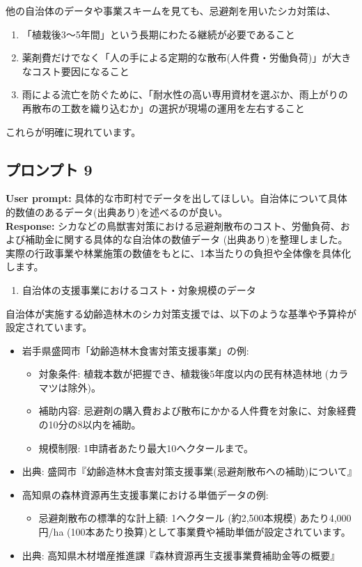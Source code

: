 \documentclass[a4paper, 11pt]{jsarticle}
\begin{document}
他の自治体のデータや事業スキームを見ても、忌避剤を用いたシカ対策は、
\begin{enumerate}
    \item 「植栽後3〜5年間」という長期にわたる継続が必要であること
    \item 薬剤費だけでなく「人の手による定期的な散布(人件費・労働負荷)」が大きなコスト要因になること
    \item 雨による流亡を防ぐために、「耐水性の高い専用資材を選ぶか、雨上がりの再散布の工数を織り込むか」の選択が現場の運用を左右すること
\end{enumerate}
これらが明確に現れています。

\subsection{プロンプト 9}
\noindent\textbf{User prompt:} 具体的な市町村でデータを出してほしい。自治体について具体的数値のあるデータ(出典あり)を述べるのが良い。 \\
\noindent\textbf{Response:} シカなどの鳥獣害対策における忌避剤散布のコスト、労働負荷、および補助金に関する具体的な自治体の数値データ (出典あり)を整理しました。
実際の行政事業や林業施策の数値をもとに、1本当たりの負担や全体像を具体化します。
\begin{enumerate}
    \item 自治体の支援事業におけるコスト・対象規模のデータ
\end{enumerate}
自治体が実施する幼齢造林木のシカ対策支援では、以下のような基準や予算枠が設定されています。
\begin{itemize}
    \item 岩手県盛岡市「幼齢造林木食害対策支援事業」の例:
    \begin{itemize}
        \item[○] 対象条件: 植栽本数が把握でき、植栽後5年度以内の民有林造林地 (カラマツは除外)。
        \item[○] 補助内容: 忌避剤の購入費および散布にかかる人件費を対象に、対象経費の10分の8以内を補助。
        \item[○] 規模制限: 1申請者あたり最大10ヘクタールまで。
    \end{itemize}
    \item 出典: 盛岡市『幼齢造林木食害対策支援事業(忌避剤散布への補助)について』\cite{ref8}
    \item 高知県の森林資源再生支援事業における単価データの例:
    \begin{itemize}
        \item[○] 忌避剤散布の標準的な計上額: 1ヘクタール (約2,500本規模) あたり4,000円/ha (100本あたり換算)として事業費や補助単価が設定されています\cite{ref13}。
    \end{itemize}
    \item 出典: 高知県木材増産推進課『森林資源再生支援事業費補助金等の概要』\cite{ref13}
\end{itemize}
\end{document}
